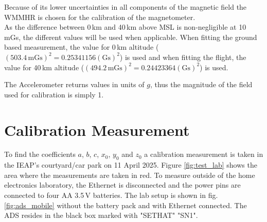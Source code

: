 Because of its lower uncertainties in all components of the magnetic field the \ac{WMMHR} is chosen for the calibration of the magnetometer.\\
As the difference between 0\,km and 40\,km above \ac{MSL} is non-negligible at 10\,mGs, the different values will be used when applicable. When fitting the ground based measurement, the value for 0\,km altitude ($(503.4\,\mathrm{mGs})^2=0.25341156\mathrm{(Gs)}^2$) is used and when fitting the flight, the value for 40\,km altitude ($(494.2\,\mathrm{mGs})^2=0.24423364\mathrm{(Gs)}^2$) is used.

The Accelerometer returns values in units of $g$, thus the magnitude of the field used for calibration is simply 1.

\section{Calibration Measurement \label{sec:da:calibration_meas}}
To find the coefficients $a$, $b$, $c$, $x_0$, $y_0$ and $z_0$ a calibration measurement is taken in the \ac{IEAP}'s courtyard/car park on 11 April 2025. Figure \ref{fig:test_lab} shows the area where the measurements are taken in red. To measure outside of the home electronics laboratory, the Ethernet is disconnected and the power pins are connected to four AA 3.5\,V batteries. The lab setup is shown in fig. \ref{fig:ads_mobile} without the battery pack and with Ethernet connected. The \ac{ADS} resides in the black box marked with "SETHAT" "SN1". 

